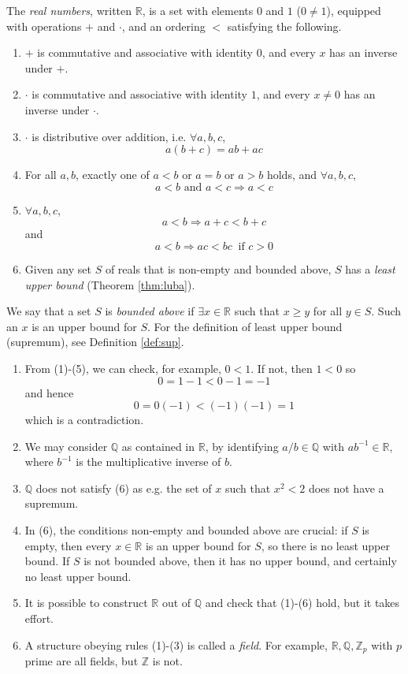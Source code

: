 \documentclass[10pt, a4paper, twoside]{report}
\begin{document}
The \emph{real numbers}, written \(\mathbb{R}\), is a set with elements \(0\) and \(1\) (\(0\neq 1\)), equipped with operations \(+\) and \(\cdot\), and an ordering \(<\) satisfying the following.
\begin{enumerate}
    \item \(+\) is commutative and associative with identity \(0\), and every \(x\) has an inverse under \(+\).
    \item \(\cdot\) is commutative and associative with identity \(1\), and every \(x\neq 0\) has an inverse under \(\cdot\).
    \item \(\cdot\) is distributive over addition, i.e. \(\forall a,b,c\),
    \[a(b+c)=ab+ac\]
    \item For all \(a,b\), exactly one of \(a<b\) or \(a=b\) or \(a>b\) holds, and \(\forall a,b,c\),
    \[a<b\text{  and  }a<c\Rightarrow a<c\]
    \item \(\forall a,b,c\),
    \[a<b\Rightarrow a+c<b+c\]
    and 
    \[a<b\Rightarrow ac<bc\:\text{  if \(c>0\)}\]
    \item Given any set \(S\) of reals that is non-empty and bounded above, \(S\) has a \emph{least upper bound} (Theorem \ref{thm:luba}). 
\end{enumerate}
We say that a set \(S\) is \emph{bounded above} if \(\exists x\in\mathbb{R}\) such that \(x\geq y\) for all \(y\in S\). Such an \(x\) is an upper bound for \(S\). For the definition of least upper bound (supremum), see Definition \ref{def:sup}. 
\begin{remark} \item[]
    \begin{enumerate}
        \item From (1)-(5), we can check, for example, \(0<1\). If not, then \(1<0\) so 
        \[0=1-1<0-1=-1\]
        and hence
        \[0=0(-1)<(-1)(-1)=1\]
        which is a contradiction.
        \item We may consider \(\mathbb{Q}\) as contained in \(\mathbb{R}\), by identifying \(a/b\in\mathbb{Q}\) with \(ab^{-1}\in\mathbb{R}\), where \(b^{-1}\) is the multiplicative inverse of \(b\).
        \item \(\mathbb{Q}\) does not satisfy (6) as e.g. the set of \(x\) such that \(x^2<2\) does not have a supremum.  
        \item In (6), the conditions non-empty and bounded above are crucial: if \(S\) is empty, then every \(x\in\mathbb{R}\) is an upper bound for \(S\), so there is no least upper bound. If \(S\) is not bounded above, then it has no upper bound, and certainly no least upper bound.
        \item It is possible to construct \(\mathbb{R}\) out of \(\mathbb{Q}\) and check that (1)-(6) hold, but it takes effort.
        \item A structure obeying rules (1)-(3) is called a \emph{field}. For example, \(\mathbb{R},\mathbb{Q},\mathbb{Z}_p\) with \(p\) prime are all fields, but \(\mathbb{Z}\) is not.
    \end{enumerate}
\end{remark}
\end{document}
